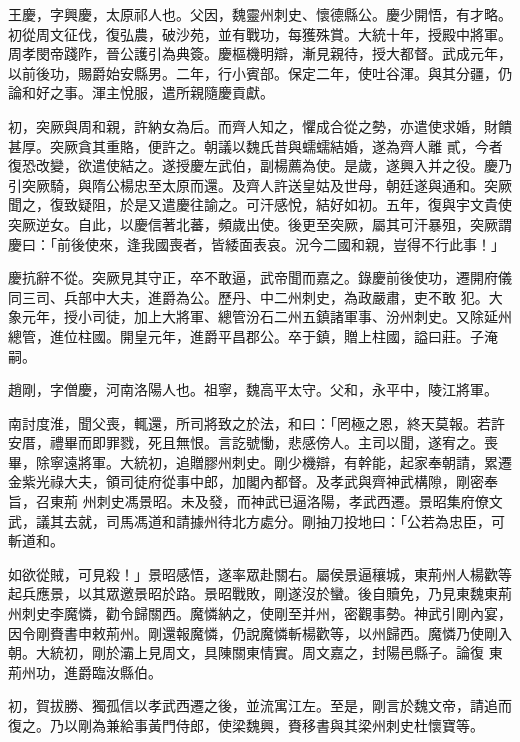 \begin{pinyinscope}
 王慶，字興慶，太原祁人也。父因，魏靈州刺史、懷德縣公。慶少開悟，有才略。初從周文征伐，復弘農，破沙苑，並有戰功，每獲殊賞。大統十年，授殿中將軍。周孝閔帝踐阼，晉公護引為典簽。慶樞機明辯，漸見親待，授大都督。武成元年，以前後功，賜爵始安縣男。二年，行小賓部。保定二年，使吐谷渾。與其分疆，仍論和好之事。渾主悅服，遣所親隨慶貢獻。



 初，突厥與周和親，許納女為后。而齊人知之，懼成合從之勢，亦遣使求婚，財饋甚厚。突厥貪其重賂，便許之。朝議以魏氏昔與蠕蠕結婚，遂為齊人離
 貳，今者復恐改變，欲遣使結之。遂授慶左武伯，副楊薦為使。是歲，遂興入并之役。慶乃引突厥騎，與隋公楊忠至太原而還。及齊人許送皇姑及世母，朝廷遂與通和。突厥聞之，復致疑阻，於是又遣慶往諭之。可汗感悅，結好如初。五年，復與宇文貴使突厥逆女。自此，以慶信著北蕃，頻歲出使。後更至突厥，屬其可汗暴殂，突厥謂慶曰：「前後使來，逢我國喪者，皆緌面表哀。況今二國和親，豈得不行此事！」



 慶抗辭不從。突厥見其守正，卒不敢逼，武帝聞而嘉之。錄慶前後使功，遷開府儀同三司、兵部中大夫，進爵為公。歷丹、中二州刺史，為政嚴肅，吏不敢
 犯。大象元年，授小司徒，加上大將軍、總管汾石二州五鎮諸軍事、汾州刺史。又除延州總管，進位柱國。開皇元年，進爵平昌郡公。卒于鎮，贈上柱國，謚曰莊。子淹嗣。



 趙剛，字僧慶，河南洛陽人也。祖寧，魏高平太守。父和，永平中，陵江將軍。



 南討度淮，聞父喪，輒還，所司將致之於法，和曰：「罔極之恩，終天莫報。若許安厝，禮畢而即罪戮，死且無恨。言訖號慟，悲感傍人。主司以聞，遂宥之。喪畢，除寧遠將軍。大統初，追贈膠州刺史。剛少機辯，有幹能，起家奉朝請，累遷金紫光祿大夫，領司徒府從事中郎，加閣內都督。及孝武與齊神武構隙，剛密奉旨，召東荊
 州刺史馮景昭。未及發，而神武已逼洛陽，孝武西遷。景昭集府僚文武，議其去就，司馬馮道和請據州待北方處分。剛抽刀投地曰：「公若為忠臣，可斬道和。



 如欲從賊，可見殺！」景昭感悟，遂率眾赴關右。屬侯景逼穰城，東荊州人楊歡等起兵應景，以其眾邀景昭於路。景昭戰敗，剛遂沒於蠻。後自贖免，乃見東魏東荊州刺史李魔憐，勸令歸關西。魔憐納之，使剛至并州，密觀事勢。神武引剛內宴，因令剛賚書申敕荊州。剛還報魔憐，仍說魔憐斬楊歡等，以州歸西。魔憐乃使剛入朝。大統初，剛於灞上見周文，具陳關東情實。周文嘉之，封陽邑縣子。論復
 東荊州功，進爵臨汝縣伯。



 初，賀拔勝、獨孤信以孝武西遷之後，並流寓江左。至是，剛言於魏文帝，請追而復之。乃以剛為兼給事黃門侍郎，使梁魏興，賚移書與其梁州刺史杜懷寶等。




\end{pinyinscope}
